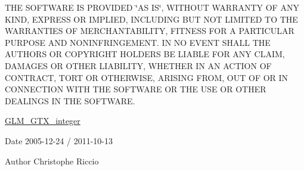 T\-H\-E S\-O\-F\-T\-W\-A\-R\-E I\-S P\-R\-O\-V\-I\-D\-E\-D \char`\"{}\-A\-S I\-S\char`\"{}, W\-I\-T\-H\-O\-U\-T W\-A\-R\-R\-A\-N\-T\-Y O\-F A\-N\-Y K\-I\-N\-D, E\-X\-P\-R\-E\-S\-S O\-R I\-M\-P\-L\-I\-E\-D, I\-N\-C\-L\-U\-D\-I\-N\-G B\-U\-T N\-O\-T L\-I\-M\-I\-T\-E\-D T\-O T\-H\-E W\-A\-R\-R\-A\-N\-T\-I\-E\-S O\-F M\-E\-R\-C\-H\-A\-N\-T\-A\-B\-I\-L\-I\-T\-Y, F\-I\-T\-N\-E\-S\-S F\-O\-R A P\-A\-R\-T\-I\-C\-U\-L\-A\-R P\-U\-R\-P\-O\-S\-E A\-N\-D N\-O\-N\-I\-N\-F\-R\-I\-N\-G\-E\-M\-E\-N\-T. I\-N N\-O E\-V\-E\-N\-T S\-H\-A\-L\-L T\-H\-E A\-U\-T\-H\-O\-R\-S O\-R C\-O\-P\-Y\-R\-I\-G\-H\-T H\-O\-L\-D\-E\-R\-S B\-E L\-I\-A\-B\-L\-E F\-O\-R A\-N\-Y C\-L\-A\-I\-M, D\-A\-M\-A\-G\-E\-S O\-R O\-T\-H\-E\-R L\-I\-A\-B\-I\-L\-I\-T\-Y, W\-H\-E\-T\-H\-E\-R I\-N A\-N A\-C\-T\-I\-O\-N O\-F C\-O\-N\-T\-R\-A\-C\-T, T\-O\-R\-T O\-R O\-T\-H\-E\-R\-W\-I\-S\-E, A\-R\-I\-S\-I\-N\-G F\-R\-O\-M, O\-U\-T O\-F O\-R I\-N C\-O\-N\-N\-E\-C\-T\-I\-O\-N W\-I\-T\-H T\-H\-E S\-O\-F\-T\-W\-A\-R\-E O\-R T\-H\-E U\-S\-E O\-R O\-T\-H\-E\-R D\-E\-A\-L\-I\-N\-G\-S I\-N T\-H\-E S\-O\-F\-T\-W\-A\-R\-E.

\hyperlink{group__gtx__integer}{G\-L\-M\-\_\-\-G\-T\-X\-\_\-integer}

\begin{DoxyDate}{Date}
2005-\/12-\/24 / 2011-\/10-\/13 
\end{DoxyDate}
\begin{DoxyAuthor}{Author}
Christophe Riccio 
\end{DoxyAuthor}
